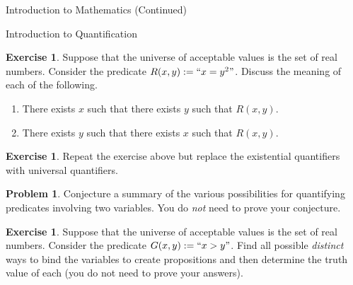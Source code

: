 \documentclass[11pt]{article}
\theoremstyle{definition}
\newtheorem{exercise}[theorem]{Exercise}
\newtheorem{problem}[theorem]{Problem}
\begin{document}
\begin{section}{Introduction to Mathematics (Continued)}
\begin{subsection}{Introduction to Quantification}
\begin{exercise}
Suppose that the universe of acceptable values is the set of real numbers.  Consider the predicate $R(x,y):=``x=y^2"$.  Discuss the meaning of each of the following.
\begin{enumerate}
\item There exists $x$ such that there exists $y$ such that $R(x,y)$.
\item There exists $y$ such that there exists $x$ such that $R(x,y)$.
\end{enumerate}
\end{exercise}

\begin{exercise}
Repeat the exercise above but replace the existential quantifiers with universal quantifiers.
\end{exercise}

\begin{problem}
Conjecture a summary of the various possibilities for quantifying predicates involving two variables.  You do \emph{not} need to prove your conjecture.
\end{problem}

\begin{exercise}
Suppose that the universe of acceptable values is the set of real numbers.  Consider the predicate $G(x,y):=``x>y"$.  Find all possible \emph{distinct} ways to bind the variables to create propositions and then determine the truth value of each (you do not need to prove your answers).
\end{exercise}

\end{subsection}

\end{section}
\end{document}
